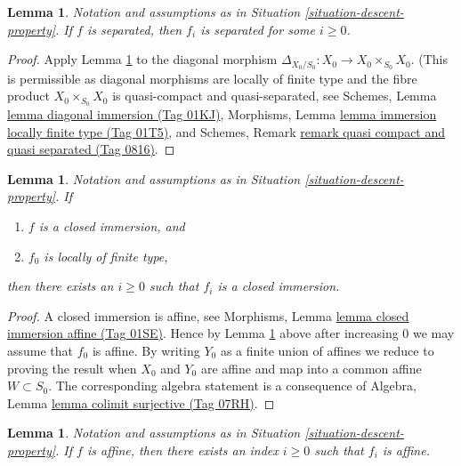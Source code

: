 \documentclass{amsart}
\theoremstyle{plain}
\newtheorem{lemma}[subsection]{Lemma}
\theoremstyle{definition}
\theoremstyle{remark}
\numberwithin{equation}{subsection}
\begin{document}
\begin{lemma}
\label{lemma-descend-separated-finite-presentation}
Notation and assumptions as in Situation \ref{situation-descent-property}.
If $f$ is separated, then $f_i$ is separated for some $i \geq 0$.
\end{lemma}

\begin{proof}
Apply Lemma \ref{lemma-descend-closed-immersion-finite-presentation}
to the diagonal morphism $\Delta_{X_0/S_0} : X_0 \to X_0 \times_{S_0} X_0$.
(This is permissible as diagonal morphisms are locally of finite type
and the fibre product $X_0 \times_{S_0} X_0$ is quasi-compact and
quasi-separated, see
Schemes, Lemma \href{https://stacks.math.columbia.edu/tag/01KJ}{lemma diagonal immersion (Tag 01KJ)},
Morphisms, Lemma \href{https://stacks.math.columbia.edu/tag/01T5}{lemma immersion locally finite type (Tag 01T5)}, and
Schemes, Remark \href{https://stacks.math.columbia.edu/tag/0816}{remark quasi compact and quasi separated (Tag 0816)}.
\end{proof}


\begin{lemma}
\label{lemma-descend-closed-immersion-finite-presentation}
Notation and assumptions as in Situation \ref{situation-descent-property}.
If
\begin{enumerate}
\item $f$ is a closed immersion, and
\item $f_0$ is locally of finite type,
\end{enumerate}
then there exists an $i \geq 0$ such that $f_i$ is a closed immersion.
\end{lemma}

\begin{proof}
A closed immersion is affine, see
Morphisms, Lemma \href{https://stacks.math.columbia.edu/tag/01SE}{lemma closed immersion affine (Tag 01SE)}.
Hence by Lemma \ref{lemma-descend-affine-finite-presentation} above
after increasing $0$ we may assume that $f_0$ is affine.
By writing $Y_0$ as a finite union of affines we reduce to proving
the result when $X_0$ and $Y_0$ are affine and map
into a common affine $W \subset S_0$. The corresponding algebra
statement is a consequence of
Algebra, Lemma \href{https://stacks.math.columbia.edu/tag/07RH}{lemma colimit surjective (Tag 07RH)}.
\end{proof}


\begin{lemma}
\label{lemma-descend-affine-finite-presentation}
Notation and assumptions as in Situation \ref{situation-descent-property}.
If $f$ is affine, then there exists an index $i \geq 0$
such that $f_i$ is affine.
\end{lemma}
\end{document}
